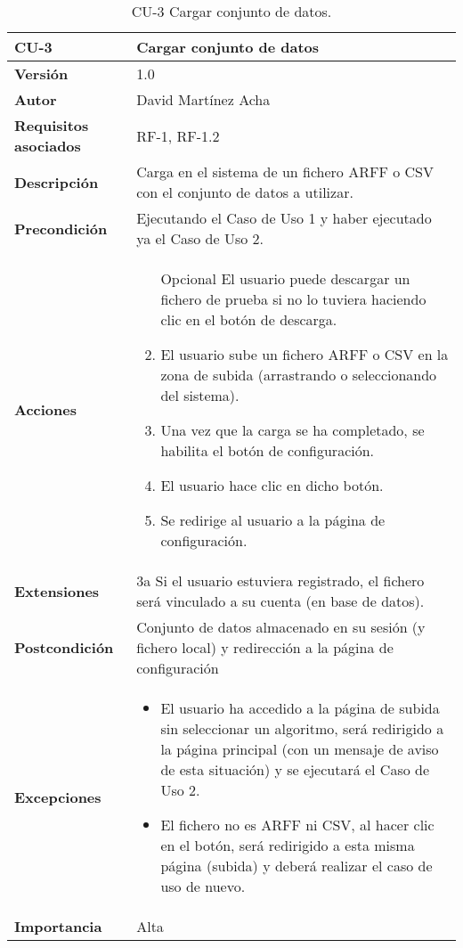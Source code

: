 \begin{table}[p]
	\centering
	\begin{tabularx}{\linewidth}{ p{} p{} }
		\toprule
		\textbf{CU-3}    & \textbf{Cargar conjunto de datos}\\
		\toprule
		\textbf{Versión}              & 1.0    \\
		\textbf{Autor}                & David Martínez Acha \\
		\textbf{Requisitos asociados} & RF-1, RF-1.2 \\
		\textbf{Descripción}          & Carga en el sistema de un fichero ARFF o CSV con el conjunto de datos a utilizar. \\
		\textbf{Precondición}         & Ejecutando el Caso de Uso 1 y haber ejecutado ya el Caso de Uso 2.\\
		\textbf{Acciones}             &
		\begin{enumerate}
			\def\labelenumi{\arabic{enumi}.}
			\tightlist
			\item [Opcional] El usuario puede descargar un fichero de prueba si no lo tuviera haciendo clic en el botón de descarga.
			\item El usuario sube un fichero ARFF o CSV en la zona de subida (arrastrando o seleccionando del sistema).
			\item Una vez que la carga se ha completado, se habilita el botón de configuración.
			\item El usuario hace clic en dicho botón.
			\item Se redirige al usuario a la página de configuración.
		\end{enumerate}\\
		\textbf{Extensiones}          & 3a Si el usuario estuviera registrado, el fichero será vinculado a su cuenta (en base de datos). \\
		\textbf{Postcondición}        & Conjunto de datos almacenado en su sesión (y fichero local) y redirección a la página de configuración \\
		\textbf{Excepciones}          & \begin{itemize}
			\item El usuario ha accedido a la página de subida sin seleccionar un algoritmo, será redirigido a la página principal (con un mensaje de aviso de esta situación) y se ejecutará el Caso de Uso 2.
			\item El fichero no es ARFF ni CSV, al hacer clic en el botón, será redirigido a esta misma página (subida) y deberá realizar el caso de uso de nuevo.
		\end{itemize} \\
		\textbf{Importancia}          & Alta \\
		\bottomrule
	\end{tabularx}
	\caption{CU-3 Cargar conjunto de datos.}
\end{table}

